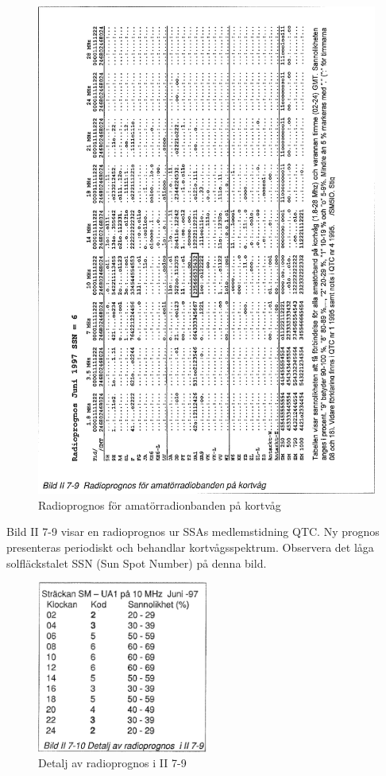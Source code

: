 \begin{figure}
  \includegraphics[width=\textwidth]{images/bild_2_7-09}
  \caption{Radioprognos för amatörradionbanden på kortvåg}
  \label{fig:bildII7-9}
\end{figure}

Bild II 7-9 visar en radioprognos ur SSAs medlemstidning QTC. Ny
prognos presenteras periodiskt och behandlar
kortvågsspektrum. Observera det låga solfläckstalet SSN (Sun Spot
Number) på denna bild.

\begin{figure}
  \includegraphics[width=0.5\textwidth]{images/bild_2_7-10}
  \caption{Detalj av radioprognos i II 7-9}
  \label{fig:bildII7-10}
\end{figure}
